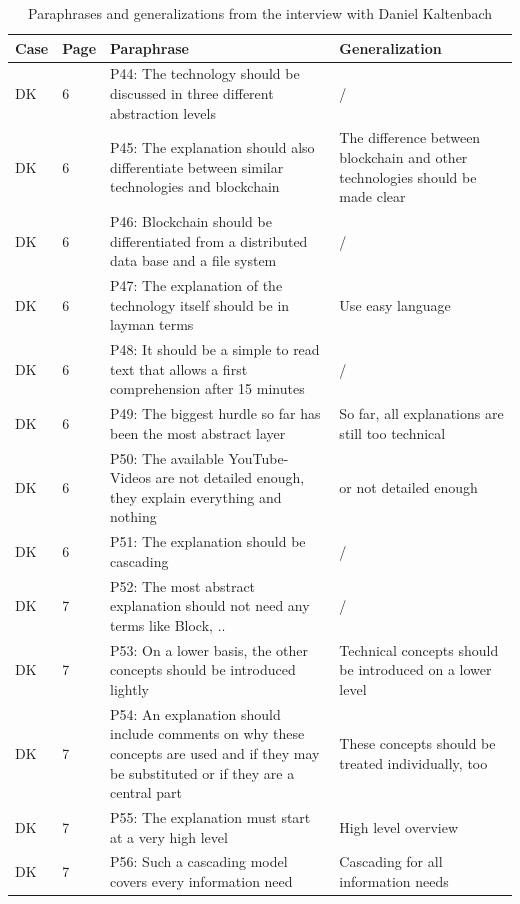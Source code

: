 \begin{table}[H]
    \centering
    \begin{tabularx}{\textwidth}{ll|X|p{4.5cm}}
    Case & Page & Paraphrase & Generalization  \\ \hline
    DK & 6 & P44: The technology should be discussed in three different abstraction levels & /   \\
	DK & 6 & P45: The explanation should also differentiate between similar technologies and blockchain & The difference between blockchain and other technologies should be made clear  \\
	DK & 6 & P46: Blockchain should be differentiated from a distributed data base and a file system & /  \\
	DK & 6 & P47: The explanation of the technology itself should be in layman terms & Use easy language   \\
	DK & 6 & P48: It should be a simple to read text that allows a first comprehension after 15 minutes & /  \\
	DK & 6 & P49: The biggest hurdle so far has been the most abstract layer & So far, all explanations are still too technical\\
	DK & 6 & P50: The available YouTube-Videos are not detailed enough, they explain everything and nothing & or not detailed enough  \\
	DK & 6 & P51: The explanation should be cascading & / \\
	DK & 7 & P52: The most abstract explanation should not need any terms like Block, .. & /   \\
	DK & 7 & P53: On a lower basis, the other concepts should be introduced lightly & Technical concepts should be introduced on a lower level  \\
	DK & 7 & P54: An explanation should include comments on why these concepts are used and if they may be substituted or if they are a central part & These concepts should be treated individually, too  \\
	DK & 7 & P55: The explanation must start at a very high level & High level overview  \\
	DK & 7 & P56: Such a cascading model covers every information need & Cascading for all information needs \\
    \end{tabularx}
    \caption{Paraphrases and generalizations from the interview with Daniel Kaltenbach}
\end{table}

